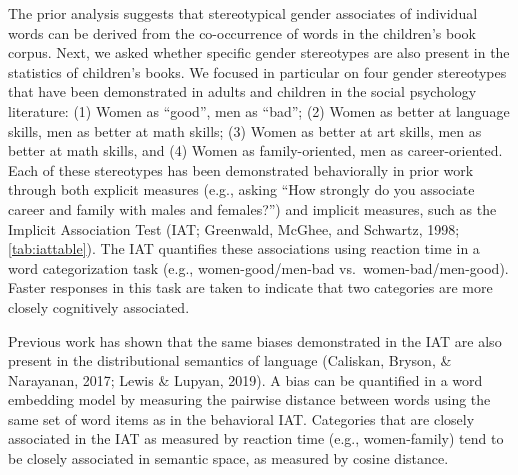 \documentclass[english,,man,floatsintext]{apa6}
\begin{document}
The prior analysis suggests that stereotypical gender associates of individual words can be derived from the co-occurrence of words in the children's book corpus. Next, we asked whether specific gender stereotypes are also present in the statistics of children's books. We focused in particular on four gender stereotypes that have been demonstrated in adults and children in the social psychology literature: (1) Women as \enquote{good}, men as \enquote{bad}; (2) Women as better at language skills, men as better at math skills; (3) Women as better at art skills, men as better at math skills, and (4) Women as family-oriented, men as career-oriented. Each of these stereotypes has been demonstrated behaviorally in prior work through both explicit measures (e.g., asking \enquote{How strongly do you associate career and family with males and females?}) and implicit measures, such as the Implicit Association Test (IAT; Greenwald, McGhee, and Schwartz, 1998; \autoref{tab:iattable}). The IAT quantifies these associations using reaction time in a word categorization task (e.g., women-good/men-bad vs.~women-bad/men-good). Faster responses in this task are taken to indicate that two categories are more closely cognitively associated.

Previous work has shown that the same biases demonstrated in the IAT are also present in the distributional semantics of language (Caliskan, Bryson, \& Narayanan, 2017; Lewis \& Lupyan, 2019). A bias can be quantified in a word embedding model by measuring the pairwise distance between words using the same set of word items as in the behavioral IAT. Categories that are closely associated in the IAT as measured by reaction time (e.g., women-family) tend to be closely associated in semantic space, as measured by cosine distance.

\begingroup\fontsize{9}{11}\selectfont
\end{document}

